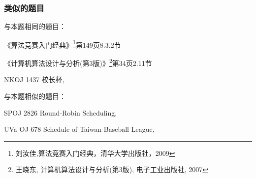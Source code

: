 \subsubsection{类似的题目}
与本题相同的题目：
\begindot
\item 《算法竞赛入门经典》\footnote{刘汝佳,算法竞赛入门经典，清华大学出版社，2009}第149页8.3.2节
\item 《计算机算法设计与分析(第3版)》\footnote{王晓东, 计算机算法设计与分析(第3版), 电子工业出版社, 2007}第34页2.11节
\item NKOJ 1437 校长杯, 
\myenddot

与本题相似的题目：
\begindot
\item SPOJ 2826 Round-Robin Scheduling, 
\item UVa OJ 678 Schedule of Taiwan Baseball League, 
\myenddot
